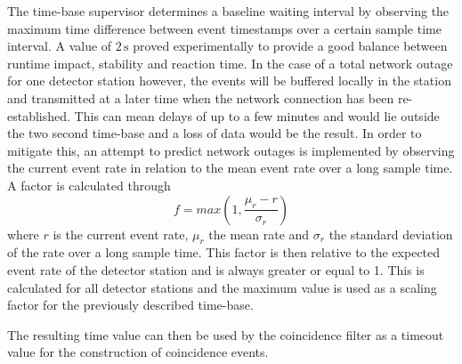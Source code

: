 \documentclass[abstract,toc,los,lof,english,10pt,glossary,acronyms,lotl]{jluthesis}
\begin{document}
The time-base supervisor determines a baseline waiting interval by observing the maximum time difference between event timestamps over a certain sample time interval. A value of $2\,\text{s}$ proved experimentally to provide a good balance between runtime impact, stability and reaction time. In the case of a total network outage for one detector station however, the events will be buffered locally in the station and transmitted at a later time when the network connection has been re-established. This can mean delays of up to a few minutes and would lie outside the two second time-base and a loss of data would be the result. In order to mitigate this, an attempt to predict network outages is implemented by observing the current event rate in relation to the mean event rate over a long sample time. A factor is calculated through
\begin{equation*}
	f = max(1, \frac{\mu_{r} - r}{\sigma_{r}})
\end{equation*}
where $r$ is the current event rate, $\mu_{r}$ the mean rate and $\sigma_{r}$ the standard deviation of the rate over a long sample time. This factor is then relative to the expected event rate of the detector station and is always greater or equal to 1. This is calculated for all detector stations and the maximum value is used as a scaling factor for the previously described time-base.

The resulting time value can then be used by the coincidence filter as a timeout value for the construction of coincidence events.
\end{document}
